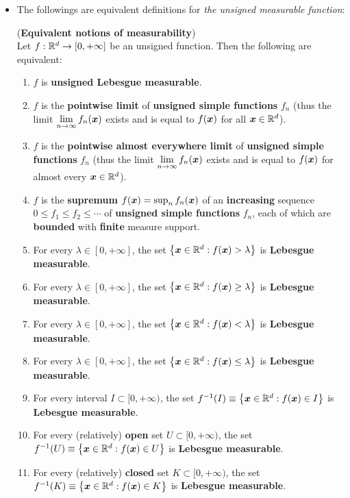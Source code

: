 \documentclass[11pt]{article}
\begin{document}
\begin{itemize}
\item The followings are equivalent definitions for \emph{the unsigned measurable function}: 
\begin{lemma} \label{lem: unsigned_measurable_function} (\textbf{Equivalent notions of measurability}) \citep{tao2011introduction} \\
Let $f : {\mathbb R}^d \rightarrow [0,+\infty]$ be an unsigned function. Then the following are equivalent:
\begin{enumerate}
\item $f$ is \textbf{unsigned Lebesgue measurable}.
\item $f$ is the \textbf{pointwise limit} of \textbf{unsigned simple functions} $f_n$ (thus the limit $\lim\limits_{n \rightarrow \infty} f_n(\boldsymbol{x})$ exists and is equal to $f(\boldsymbol{x})$ for all $\boldsymbol{x} \in {\mathbb R}^d$).
\item $f$ is the \textbf{pointwise almost everywhere limit} of \textbf{unsigned simple functions} $f_n$ (thus the limit $\lim\limits_{n \rightarrow \infty} f_n(\boldsymbol{x})$ exists and is equal to $f(\boldsymbol{x})$ for almost every $\boldsymbol{x} \in  {\mathbb R}^d$).
\item $f$ is the \textbf{supremum} $f(\boldsymbol{x}) = \sup_{n} f_{n}(\boldsymbol{x})$ of an \textbf{increasing} sequence $0 \le f_1 \le f_2 \le \cdots $ of \textbf{unsigned simple functions} $f_n$, each of which are \textbf{bounded} with \textbf{finite} measure support.
\item For every $\lambda \in [0, +\infty]$, the set $\left\{ \boldsymbol{x} \in  {\mathbb R}^d : f(\boldsymbol{x}) > \lambda\right\}$ is \textbf{Lebesgue measurable}.
\item For every $\lambda \in [0, +\infty]$, the set $\left\{ \boldsymbol{x} \in  {\mathbb R}^d : f(\boldsymbol{x}) \ge \lambda\right\}$ is \textbf{Lebesgue measurable}.
\item For every $\lambda \in [0, +\infty]$, the set $\left\{ \boldsymbol{x} \in  {\mathbb R}^d : f(\boldsymbol{x}) < \lambda\right\}$ is \textbf{Lebesgue measurable}.
\item For every $\lambda \in [0, +\infty]$, the set $\left\{ \boldsymbol{x} \in  {\mathbb R}^d : f(\boldsymbol{x}) \le \lambda\right\}$ is \textbf{Lebesgue measurable}.
\item For every interval $I \subset [0,+\infty)$, the set $f^{-1}(I) \equiv \left\{\boldsymbol{x} \in  {\mathbb R}^d : f(\boldsymbol{x}) \in I\right\}$ is \textbf{Lebesgue measurable}.
\item For every (relatively) \textbf{open} set $U \subset [0,+\infty)$, the set $f^{-1}(U) \equiv \left\{\boldsymbol{x} \in  {\mathbb R}^d : f(\boldsymbol{x}) \in U\right\}$ is \textbf{Lebesgue measurable}.
\item For every (relatively) \textbf{closed} set $K \subset [0,+\infty)$, the set $f^{-1}(K) \equiv \left\{\boldsymbol{x} \in  {\mathbb R}^d : f(\boldsymbol{x}) \in K\right\}$ is \textbf{Lebesgue measurable}.

\end{enumerate}
\end{lemma}
\end{itemize}
\end{document}
